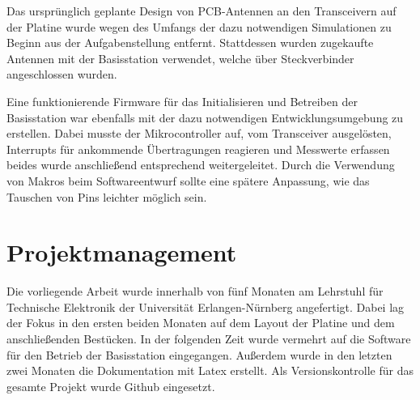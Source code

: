 Das ursprünglich geplante Design von PCB-Antennen an den Transceivern auf der Platine wurde wegen des Umfangs der dazu  notwendigen Simulationen  zu Beginn aus der Aufgabenstellung entfernt. Stattdessen wurden zugekaufte Antennen mit der Basisstation verwendet, welche über Steckverbinder angeschlossen wurden.

Eine funktionierende Firmware für das Initialisieren und Betreiben der Basisstation war ebenfalls mit der dazu notwendigen Entwicklungsumgebung zu erstellen. Dabei musste der Mikrocontroller auf, vom Transceiver ausgelösten, Interrupts für ankommende Übertragungen reagieren und Messwerte erfassen beides wurde anschließend entsprechend weitergeleitet. Durch die Verwendung von Makros beim Softwareentwurf sollte eine spätere Anpassung, wie das Tauschen von Pins leichter möglich sein.


\section{Projektmanagement}
Die vorliegende Arbeit wurde innerhalb von fünf Monaten am Lehrstuhl für Technische Elektronik der Universität Erlangen-Nürnberg angefertigt. Dabei lag der Fokus in den ersten beiden Monaten auf dem Layout der Platine und dem anschließenden Bestücken. In der folgenden Zeit wurde vermehrt auf die Software für den Betrieb der Basisstation eingegangen. Außerdem wurde in den letzten zwei Monaten die Dokumentation mit Latex erstellt. Als Versionskontrolle für das gesamte Projekt wurde Github eingesetzt.

